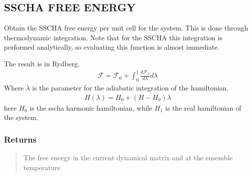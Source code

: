 \documentclass[a4paper,11pt,english]{sphinxmanual}
\begin{document}
\begin{fulllineitems}
\begin{fulllineitems}
\label{\detokenize{apireference:sscha.SchaMinimizer.SSCHA_Minimizer.get_free_energy}}
\pysigstartsignatures
{}
\pysigstopsignatures

\subsection{SSCHA FREE ENERGY}
\label{\detokenize{apireference:id31}}
\sphinxAtStartPar
Obtain the SSCHA free energy per unit cell for the system. This is done through thermodynamic integration.
Note that for the SSCHA this integration is performed analytically, so evaluating this function
is almost immediate.

\sphinxAtStartPar
The result is in Rydberg.
\begin{equation*}
\begin{split}\mathcal F = \mathcal F_0 + \int_0^1 \frac{d\mathcal F_\lambda}{d\lambda} d\lambda\end{split}
\end{equation*}
\sphinxAtStartPar
Where \(\lambda\) is the parameter for the adiabatic integration of the hamiltonian.
\begin{equation*}
\begin{split}H(\lambda) = H_0 + (H - H_0) \lambda\end{split}
\end{equation*}
\sphinxAtStartPar
here \(H_0\) is the sscha harmonic hamiltonian, while \(H_1\) is the real hamiltonian
of the system.


\subsubsection{Returns}
\label{\detokenize{apireference:id32}}\begin{quote}
\begin{description}
\sphinxAtStartPar
The free energy in the current dynamical matrix and at the ensemble temperature

\end{description}
\end{quote}

\end{fulllineitems}



\end{fulllineitems}
\end{document}
